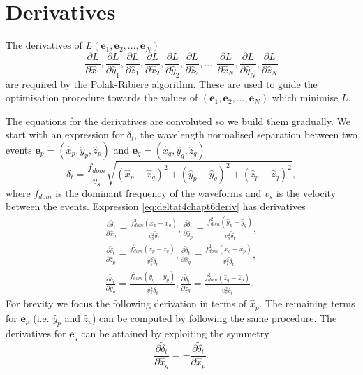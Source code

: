 \documentclass[extra]{gji}
\begin{document}
\section{Derivatives}
\label{sec-Appendix-derivatives_ofL}

The derivatives of $L(\mathbf{e}_1,\mathbf{e}_2,...,\mathbf{e}_N)$
\begin{equation}
\frac{\partial L}{\partial \hat{x}_1},
\frac{\partial L}{\partial \hat{y}_1},
 \frac{\partial L}{\partial \hat{z}_1},
\frac{\partial L}{\partial \hat{x}_2},
\frac{\partial L}{\partial \hat{y}_2},
\frac{\partial L}{\partial \hat{z}_2},
...,
\frac{\partial L}{\partial \hat{x}_N},
\frac{\partial L}{\partial \hat{y}_N},
\frac{\partial L}{\partial \hat{z}_N}
\end{equation}
are required by the Polak-Ribiere algorithm. These are used to guide the optimisation procedure
towards the values of $(\mathbf{e}_1,\mathbf{e}_2,...,\mathbf{e}_N)$ which
minimise $L$.

The equations for the derivatives are convoluted so we
build them gradually. We start with an expression for $\delta_t$, the wavelength normalised separation between two events
$\mathbf{e}_p= (\hat{x}_p,\hat{y}_p,\hat{z}_p)$ and $\mathbf{e}_q = (\hat{x}_q,\hat{y}_q,\hat{z}_q)$
\begin{equation}
\label{eq:deltat4chapt6deriv}
\delta_t = \frac{f_{dom}}{v_s}\sqrt{(\hat{x}_p-\hat{x}_q)^2 + (\hat{y}_p-\hat{y}_q)^2 +  (\hat{z}_p-\hat{z}_q)^2},
\end{equation}
where $f_{dom}$ is the dominant frequency of the waveforms and $v_s$ is the velocity between the events. Expression
\ref{eq:deltat4chapt6deriv} has derivatives
\begin{equation}
\label{eq-partial-xyz1}
\begin{array}{l}
\frac{\partial \widetilde{\delta}_t}{\partial \hat{x}_p} = \frac{f_{dom}^2 (\hat{x}_p-\hat{x}_q)}{v_s^2 \widetilde{\delta}_t},
\frac{\partial \widetilde{\delta}_t}{\partial \hat{y}_p} = \frac{f_{dom}^2 (\hat{y}_p-\hat{y}_q)}{v_s^2 \widetilde{\delta}_t}, \\
\frac{\partial \widetilde{\delta}_t}{\partial \hat{z}_p} = \frac{f_{dom}^2 (\hat{z}_p-\hat{z}_q)}{v_s^2 \widetilde{\delta}_t},
\frac{\partial \widetilde{\delta}_t}{\partial \hat{x}_q} = \frac{f_{dom}^2 (\hat{x}_q-\hat{x}_p)}{v_s^2 \widetilde{\delta}_t}, \\
\frac{\partial \widetilde{\delta}_t}{\partial \hat{y}_q} = \frac{f_{dom}^2 (\hat{y}_q-\hat{y}_p)}{v_s^2 \widetilde{\delta}_t},
\frac{\partial \widetilde{\delta}_t}{\partial \hat{z}_q} = \frac{f_{dom}^2 (\hat{z}_q-\hat{z}_p)}{v_s^2 \widetilde{\delta}_t}.
\end{array}
\end{equation}
For brevity we focus the following derivation in terms of $\hat{x}_p$. The remaining terms for $\mathbf{e}_p$
(i.e. $\hat{y}_p$ and $\hat{z}_p$) can be computed
by following the same procedure. The derivatives for $\mathbf{e}_q$ can be attained by exploiting the symmetry
\begin{equation}
\label{eq:ep2eq-deriv-symmetry}
\frac{\partial \widetilde{\delta}_t}{\partial \hat{x}_q} = - \frac{\partial \widetilde{\delta}_t}{\partial \hat{x}_p}.
\end{equation}
\end{document}
